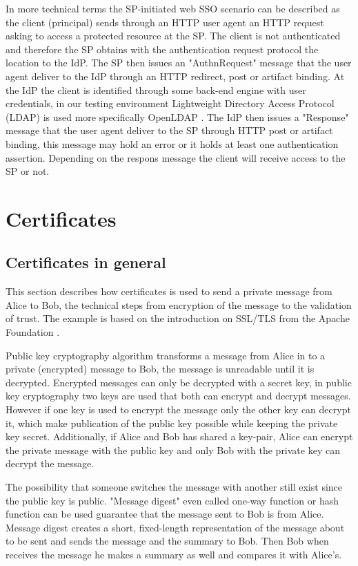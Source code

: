 In more technical terms the SP-initiated web SSO scenario can be described as the client (principal) sends through an HTTP user agent
an HTTP request asking to access a protected resource at the SP. The client is not authenticated and therefore the SP
obtains with the authentication request protocol the location to the IdP. The SP then issues an "AuthnRequest" message
that the user agent deliver to the IdP through an HTTP redirect, post or artifact binding.
At the IdP the client is identified through some back-end engine with user credentials, in
our testing environment Lightweight Directory Access Protocol (LDAP) is used more specifically OpenLDAP \cite{website:openldap}.
The IdP then issues a "Response" message that the user agent deliver to the SP through HTTP post or artifact binding,
this message may hold an error or it holds at least one authentication assertion. Depending on the respons message the client will
receive access to the SP or not. \cite[p.~15]{pdf:oasis-open-profiles}
\section{Certificates}
\subsection{Certificates in general}

This section describes how certificates is used to send a private message from Alice to Bob, the technical steps from encryption 
of the message to the validation of trust.
The example is based on the introduction on SSL/TLS from the Apache Foundation \cite{website:ssl_intro}.

Public key cryptography algorithm transforms a message from Alice in to a private (encrypted) message to Bob, 
the message is unreadable until it is decrypted. 
Encrypted messages can only be decrypted with a secret key, in public key cryptography two keys are used that both can encrypt and 
decrypt messages. 
However if one key is used to encrypt the message only the other key can decrypt it, which make publication of the public key 
possible while keeping the private key secret. 
Additionally, if Alice and Bob has shared a key-pair, Alice can encrypt the private message with the public key and only Bob 
with the private key can decrypt the message.

The possibility that someone switches the message with another still exist since the public 
key is public. "Message digest" even called one-way function or hash function can be used guarantee that the message sent to Bob is 
from Alice. Message digest creates a short, fixed-length representation of the message about to be sent and sends the message and
the summary to Bob.
Then Bob when receives the message he makes a summary as well and compares it with Alice's.

